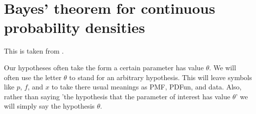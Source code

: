 
\section{Bayes' theorem for continuous probability densities}

This is taken from \cite{OrloffBloom2014}.

Our hypotheses often take the form a certain parameter has value $\theta$. We will often use the letter $\theta$  to stand for an arbitrary hypothesis. This will leave symbols like $p$, $f$, and $x$ to take there usual meanings as \ac{PMF}, \ac{PDFun}, and data. Also, rather than saying 'the hypothesis that the parameter of interest has value $\theta$' we will simply say the hypothesis $\theta$.

